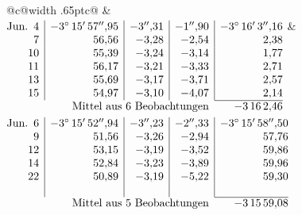 \noindent\begin{tabular}{@{}c@{\hspace{.4em}\vrule width .65pt\hspace{.4em}}c@{}}
 &
 \\[.18ex]
\(\begin{array}[t]{@{}r|r|r|r|r@{}}
\text{Jun.}\enspace 4 & -3^\circ\,15'\,57''{,}95 & -3''{,}31 & -1''{,}90 & -3^\circ\,16'\,3''{,}16\\
7 & 56{,}56 & -3{,}28 & -2{,}54 & 2{,}38\\
10 & 55{,}39 & -3{,}24 & -3{,}14 & 1{,}77\\
11 & 56{,}17 & -3{,}21 & -3{,}33 & 2{,}71\\
13 & 55{,}69 & -3{,}17 & -3{,}71 & 2{,}57\\
15 & 54{,}97 & -3{,}10 & -4{,}07 & 2{,}14\\
\cline{5-5}
\multicolumn{4}{r}{\text{Mittel aus 6 Beobachtungen}} & -3\,16\,2{,}46
\end{array}\)
&
\(\begin{array}[t]{@{}r|r|r|r|r@{}}
\text{Jun.}\enspace 6 & -3^\circ\,15'\,52''{,}94 & -3''{,}23 & -2''{,}33 & -3^\circ\,15'\,58''{,}50\\
9 & 51{,}56 & -3{,}26 & -2{,}94 & 57{,}76\\
12 & 53{,}15 & -3{,}19 & -3{,}52 & 59{,}86\\
14 & 52{,}84 & -3{,}23 & -3{,}89 & 59{,}96\\
22 & 50{,}89 & -3{,}19 & -5{,}22 & 59{,}30\\
 & & & & \\
\cline{5-5}
\multicolumn{4}{r}{\text{Mittel aus 5 Beobachtungen}} & -3\,15\,59{,}08
\end{array}\)
\end{tabular}\par\medskip
{}
